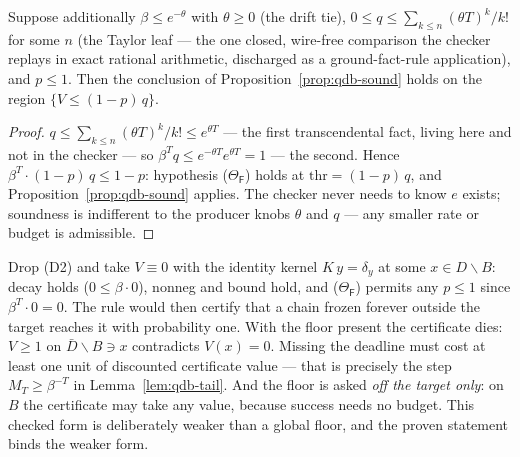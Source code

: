 \begin{bprop}
\label{prop:qdb-catalogue}
Suppose additionally $\beta \le e^{-\theta}$ with $\theta \ge 0$ (the
drift tie), $0 \le q \le \sum_{k \le n} (\theta T)^k / k!$ for some $n$
(the Taylor leaf --- the one closed, wire-free comparison the checker
replays in exact rational arithmetic, discharged as a ground-fact-rule
application), and $p \le 1$. Then the conclusion of
Proposition~\ref{prop:qdb-sound} holds on the region
$\{V \le (1-p)\,q\}$.
\end{bprop}
\begin{proof}
$q \le \sum_{k \le n} (\theta T)^k/k! \le e^{\theta T}$ --- the first
transcendental fact, living here and not in the checker --- so
$\beta^{T} q \le e^{-\theta T} e^{\theta T} = 1$ --- the second. Hence
$\beta^{T} \cdot (1-p)\,q \le 1 - p$: hypothesis
($\Theta_{\mathsf F}$) holds at $\mathrm{thr} = (1-p)\,q$, and
Proposition~\ref{prop:qdb-sound} applies. The checker never needs to
know $e$ exists; soundness is indifferent to the producer knobs
$\theta$ and $q$ --- any smaller rate or budget is admissible.
\end{proof}

\begin{bremark}
\label{rem:qdb-floor}
Drop (D2) and take $V \equiv 0$ with the identity kernel
$K\,y = \delta_y$ at some $x \in D \smallsetminus B$: decay holds
($0 \le \beta \cdot 0$), nonneg and bound hold, and
($\Theta_{\mathsf F}$) permits any $p \le 1$ since
$\beta^T \cdot 0 = 0$. The rule would then certify that a chain frozen
forever outside the target reaches it with probability one. With the
floor present the certificate dies: $V \ge 1$ on
$\bar{D} \smallsetminus B \ni x$ contradicts $V(x) = 0$. Missing the
deadline must cost at least one unit of discounted certificate value ---
that is precisely the step $M_T \ge \beta^{-T}$ in
Lemma~\ref{lem:qdb-tail}. And the floor is asked \emph{off the target
only}: on $B$ the certificate may take any value, because success needs
no budget. This checked form is deliberately weaker than a global
floor, and the proven statement binds the weaker form.
\end{bremark}

